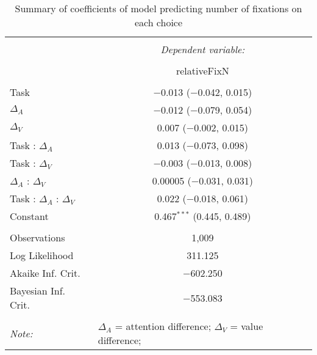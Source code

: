 
\begin{table}[!b] \centering 
  \caption{Summary of coefficients of model predicting number of fixations on each choice} 
  \label{table:nFixModel} 
\begin{tabular}{@{\extracolsep{5pt}}lc} 
\\[-1.8ex]\hline 
\hline \\[-1.8ex] 
 & \multicolumn{1}{c}{\textit{Dependent variable:}} \\ 
\cline{2-2} 
\\[-1.8ex] & relativeFixN \\ 
\hline \\[-1.8ex] 
 Task & $-$0.013 ($-$0.042, 0.015) \\ 
  $\Delta_A$ & $-$0.012 ($-$0.079, 0.054) \\ 
  $\Delta_V$ & 0.007 ($-$0.002, 0.015) \\ 
  Task : $\Delta_A$ & 0.013 ($-$0.073, 0.098) \\ 
  Task : $\Delta_V$ & $-$0.003 ($-$0.013, 0.008) \\ 
  $\Delta_A$ : $\Delta_V$ & 0.00005 ($-$0.031, 0.031) \\ 
  Task : $\Delta_A$ :  $\Delta_V$ & 0.022 ($-$0.018, 0.061) \\ 
  Constant & 0.467$^{***}$ (0.445, 0.489) \\ 
 \hline \\[-1.8ex] 
Observations & 1,009 \\ 
Log Likelihood & 311.125 \\ 
Akaike Inf. Crit. & $-$602.250 \\ 
Bayesian Inf. Crit. & $-$553.083 \\ 
\hline 
\hline \\[-1.8ex] 
\textit{Note:}  & \multicolumn{1}{l}{\footnotesize $\Delta_A$ = attention difference; $\Delta_V$ = value difference; } \\ 
\end{tabular} 
\end{table} 
